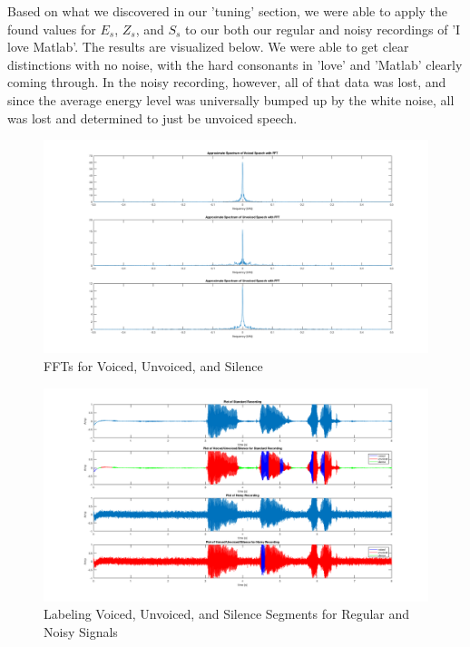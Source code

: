 \documentclass[11pt]{article}
\begin{document}
Based on what we discovered in our 'tuning' section, we were able to apply the found values for $E_s$, $Z_s$, and $S_s$ to our both our regular and noisy recordings of 'I love Matlab'. The results are visualized below. We were able to get clear distinctions with no noise, with the hard consonants in 'love' and 'Matlab' clearly coming through. In the noisy recording, however, all of that data was lost, and since the average energy level was universally bumped up by the white noise, all was lost and determined to just be unvoiced speech.

\begin{figure}[H]
  \centering
  \includegraphics[scale=.25]{part1_spectrums.png}
  \caption{FFTs for Voiced, Unvoiced, and Silence}
\end{figure}

\begin{figure}[H]
  \centering
  \includegraphics[scale=.25]{part1_4_labeling.png}
  \caption{Labeling Voiced, Unvoiced, and Silence Segments for Regular and Noisy Signals}
\end{figure}


%
%
%
%
%
\end{document}
